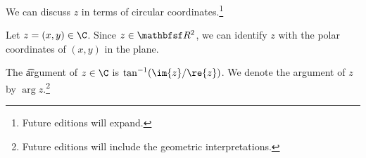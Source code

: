 

We can discuss $z$ in terms of circular coordinates.\footnote{Future editions will expand.}


Let $z = (x, y) \in \C$.
Since $z \in \R^2$, we can identify $z$ with the polar coordinates of $(x, y)$ in the plane.

The \t{argument} of $z \in \C$ is $\tan^{-1}(\im{z}/\re{z})$.
We denote the argument of $z$ by $\arg z$.\footnote{Future editions will include the geometric interpretations.}

\blankpage
